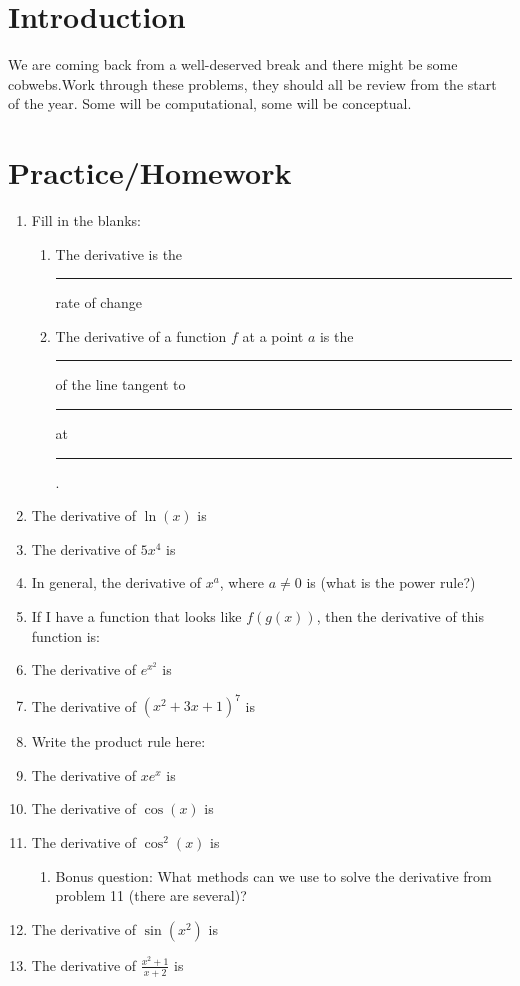 \documentclass{article}[12pt]
\theoremstyle{definition}
\theoremstyle{example}
\theoremstyle{theorem}
\begin{document}
\section{Introduction}
We are coming back from a well-deserved break and there might be some cobwebs.Work through these problems, they should all be review from the start of the year. Some will be computational, some will be conceptual. 
\section{Practice/Homework}
\begin{enumerate}
\item Fill in the blanks:
\begin{enumerate}
\item The derivative is the \rule{1cm}{0.15mm} rate of change
\item The derivative of a function $f$ at a point $a$ is the \rule{1cm}{0.15mm} of the line tangent to \rule{1cm}{0.15mm} at \rule{1cm}{0.15mm}. 
\end{enumerate}
\item The derivative of $\ln(x)$ is 
\item The derivative of $5x^4$ is
\item In general, the derivative of $x^a$, where $a\neq 0$ is (what is the power rule?)
\item If I have a function that looks like $f(g(x))$, then the derivative of this function is:
\item The derivative of $e^{x^2}$ is 
\item The derivative of $(x^2+3x+1)^7$ is 
\item Write the product rule here: 
\item The derivative of $xe^x$ is
\item The derivative of $\cos(x)$ is 
\item The derivative of $\cos^2(x)$ is 
\begin{enumerate}
\item Bonus question: What methods can we use to solve the derivative from problem 11 (there are several)?
\end{enumerate}
\item The derivative of $\sin(x^2)$ is 
\item The derivative of $\frac{x^2+1}{x+2}$ is 

\end{enumerate}
\end{document}
